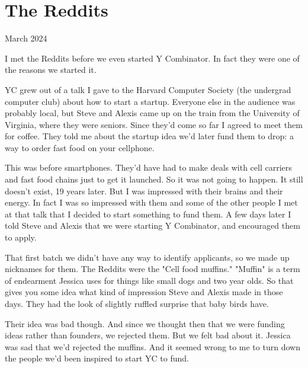 \chapter{The Reddits}


            
              
                

March 2024

I met the Reddits before we even
                  started Y Combinator. In fact they were one of the reasons we
                  started it.

YC grew out of a talk I gave to the
                  Harvard Computer Society (the undergrad computer club) about
                  how to start a startup. Everyone else in the audience was
                  probably local, but Steve and Alexis came up on the train from
                  the University of Virginia, where they were seniors. Since
                  they'd come so far I agreed to meet them for coffee. They told
                  me about the startup idea we'd later fund them to drop: a way
                  to order fast food on your cellphone.

This was
                  before smartphones. They'd have had to make deals with cell
                  carriers and fast food chains just to get it launched. So it
                  was not going to happen. It still doesn't exist, 19 years
                  later. But I was impressed with their brains and their energy.
                  In fact I was so impressed with them and some of the other
                  people I met at that talk that I decided to start something to
                  fund them. A few days later I told Steve and Alexis that we
                  were starting Y Combinator, and encouraged them to
                  apply.

That first batch we didn't have any way to
                  identify applicants, so we made up nicknames for them. The
                  Reddits were the "Cell food muffins." "Muffin" is a term of
                  endearment Jessica uses for things like small dogs and two
                  year olds. So that gives you some idea what kind of impression
                  Steve and Alexis made in those days. They had the look of
                  slightly ruffled surprise that baby birds have.

Their
                  idea was bad though. And since we thought then that we were
                  funding ideas rather than founders, we rejected them. But we
                  felt bad about it. Jessica was sad that we'd rejected the
                  muffins. And it seemed wrong to me to turn down the people
                  we'd been inspired to start YC to fund.

